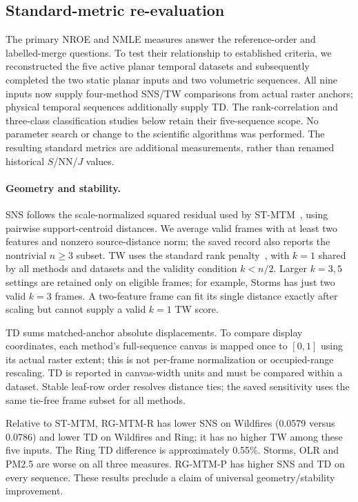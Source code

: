 \subsection{Standard-metric re-evaluation}\label{sec:standard_metrics}
The primary NROE and NMLE measures answer the reference-order and labelled-merge questions. To test their relationship to established criteria, we reconstructed the five active planar temporal datasets and subsequently completed the two static planar inputs and two volumetric sequences. All nine inputs now supply four-method SNS/TW comparisons from actual raster anchors; physical temporal sequences additionally supply TD. The rank-correlation and three-class classification studies below retain their five-sequence scope. No parameter search or change to the scientific algorithms was performed. The resulting standard metrics are additional measurements, rather than renamed historical $S$/NN/$J$ values.

\paragraph{Geometry and stability.}
SNS follows the scale-normalized squared residual used by ST-MTM~\cite{Smelser:2025:Scale,STMTM:2026}, using pairwise support-centroid distances. We average valid frames with at least two features and nonzero source-distance norm; the saved record also reports the nontrivial $n\ge3$ subset. TW uses the standard rank penalty~\cite{Venna:2001:NP}, with $k=1$ shared by all methods and datasets and the validity condition $k<n/2$. Larger $k=3,5$ settings are retained only on eligible frames; for example, Storms has just two valid $k=3$ frames. A two-feature frame can fit its single distance exactly after scaling but cannot supply a valid $k=1$ TW score.

TD sums matched-anchor absolute displacements. To compare display coordinates, each method's full-sequence canvas is mapped once to $[0,1]$ using its actual raster extent; this is not per-frame normalization or occupied-range rescaling. TD is reported in canvas-width units and must be compared within a dataset. Stable leaf-row order resolves distance ties; the saved sensitivity uses the same tie-free frame subset for all methods.



Relative to ST-MTM, RG-MTM-R has lower SNS on Wildfires (0.0579 versus 0.0786) and lower TD on Wildfires and Ring; it has no higher TW among these five inputs. The Ring TD difference is approximately 0.55\%. Storms, OLR and PM2.5 are worse on all three measures. RG-MTM-P has higher SNS and TD on every sequence. These results preclude a claim of universal geometry/stability improvement.

